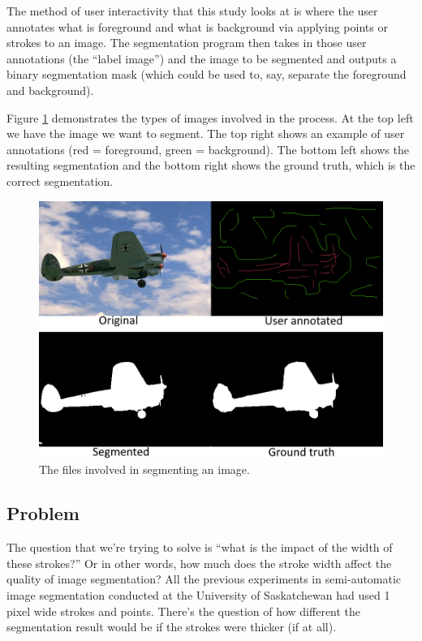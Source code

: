 \documentclass[12pt,a4paper,notitlepage]{article}
\begin{document}
The method of user interactivity that this study looks at is where the user annotates what is foreground and what is background via applying points or strokes to an image. The segmentation program then takes in those user annotations (the ``label image'') and the image to be segmented and outputs a binary segmentation mask (which could be used to, say, separate the foreground and background).

Figure \ref{fig:example_combined} demonstrates the types of images involved in the process. At the top left we have the image we want to segment. The top right shows an example of user annotations (red = foreground, green = background). The bottom left shows the resulting segmentation and the bottom right shows the ground truth, which is the correct segmentation.

\begin{figure}[h]
	\includegraphics[width=\linewidth]{example_combined}
	\caption{The files involved in segmenting an image.}
	\label{fig:example_combined}
\end{figure}

\subsection{Problem}
The question that we're trying to solve is ``what is the impact of the width of these strokes?'' Or in other words, how much does the stroke width affect the quality of image segmentation? All the previous experiments in semi-automatic image segmentation conducted at the University of Saskatchewan had used 1 pixel wide strokes and points. There's the question of how different the segmentation result would be if the strokes were thicker (if at all).
\end{document}
